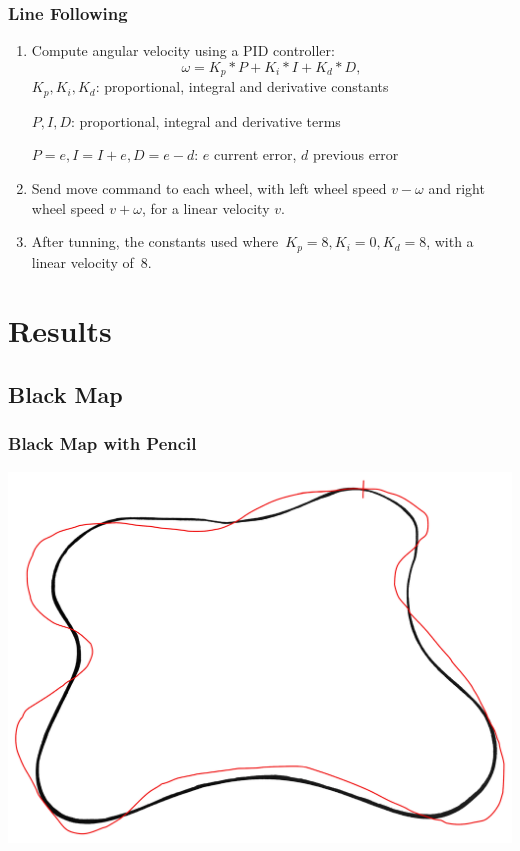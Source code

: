 \documentclass{beamer}
\begin{document}

\begin{frame}
\frametitle{Line Following}
\begin{enumerate}[<+->]
	\item Compute angular velocity using a PID controller:
		$$\omega = K_p * P + K_i * I + K_d * D,$$
		$K_p, K_i, K_d$: proportional, integral and derivative constants

		$P, I, D$: proportional, integral and derivative terms
		
		$P = e, I = I + e, D = e - d$: $e$ current error, $d$ previous error
	\item Send move command to each wheel, with left wheel speed $v - \omega$ and right wheel speed $v + \omega$, for a linear velocity $v$.
	\item After tunning, the constants used where~$K_p = 8, K_i = 0, K_d = 8$, with a linear velocity of~$8$.
\end{enumerate}
\end{frame}


\section{Results}
\subsection{Black Map} 
\begin{frame}
\frametitle{Black Map with Pencil}
\begin{center}
\includegraphics[scale=0.08]{img/result.png}
\end{center}
\end{frame}
\end{document}
